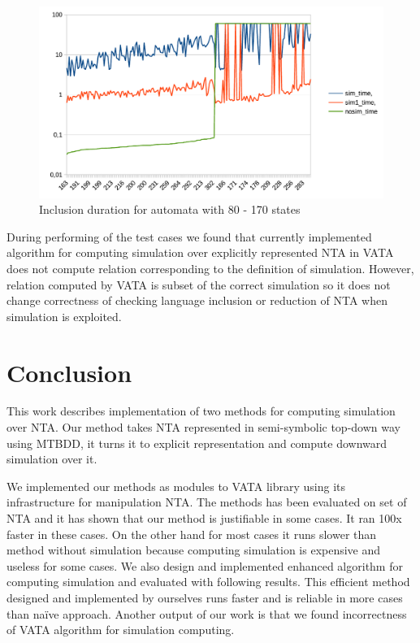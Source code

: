 \documentclass[a4paper, 12pt]{article}
\begin{document}
\begin{figure}[h!]
	\centering
	\includegraphics{g2_advanced}
	\caption{Inclusion duration for automata with 80 - 170 states}
	\label{fig:g_advanced}
\end{figure}

During performing of the test cases we found that currently implemented algorithm for computing simulation over explicitly represented NTA in VATA does not compute relation corresponding to the definition of simulation.
However, relation computed by VATA is subset of the correct simulation so it does not change correctness of checking language inclusion or reduction of NTA when simulation is exploited.

\section{Conclusion}
\label{sec:end}

This work describes implementation of two  methods for computing simulation over NTA.
Our method takes NTA represented in semi-symbolic top-down way using MTBDD, it
turns it to explicit representation and compute downward simulation over it.

We implemented our methods as modules to VATA library using its infrastructure for manipulation NTA.
The methods has been evaluated on set of NTA and it has shown that our method is justifiable in some cases.
It ran 100x faster in these cases. On the other hand for most cases it runs slower than method without simulation because computing simulation is expensive and useless for some cases.
We also design and implemented enhanced algorithm for computing simulation and evaluated with following results. This efficient method designed and implemented by ourselves runs faster and is reliable in more cases than na{\"i}ve approach.
Another output of our work is that we found incorrectness of VATA algorithm for simulation computing.
\end{document}
